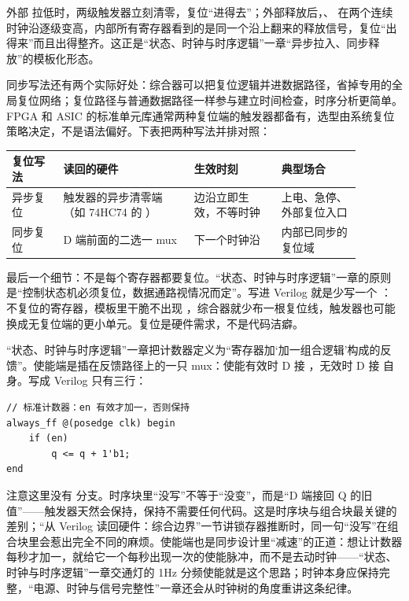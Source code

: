 外部  拉低时，两级触发器立刻清零，复位“进得去”；外部释放后，、 在两个连续时钟沿逐级变高，内部所有寄存器看到的是同一个沿上翻来的释放信号，复位“出得来”而且出得整齐。这正是“状态、时钟与时序逻辑”一章“异步拉入、同步释放”的模板化形态。

同步写法还有两个实际好处：综合器可以把复位逻辑并进数据路径，省掉专用的全局复位网络；复位路径与普通数据路径一样参与建立时间检查，时序分析更简单。FPGA 和 ASIC 的标准单元库通常两种复位端的触发器都备有，选型由系统复位策略决定，不是语法偏好。下表把两种写法并排对照：

\begin{longtable}{L{0.13\linewidth}L{0.33\linewidth}L{0.22\linewidth}L{0.20\linewidth}}
\toprule
复位写法 & 读回的硬件 & 生效时刻 & 典型场合 \\
\midrule
异步复位 & 触发器的异步清零端（如 74HC74 的 ） &  边沿立即生效，不等时钟 & 上电、急停、外部复位入口 \\\tablerowrule
同步复位 & D 端前面的二选一 mux & 下一个时钟沿 & 内部已同步的复位域 \\
\bottomrule
\end{longtable}

最后一个细节：不是每个寄存器都要复位。“状态、时钟与时序逻辑”一章的原则是“控制状态机必须复位，数据通路视情况而定”。写进 Verilog 就是少写一个 ：不复位的寄存器，模板里干脆不出现 ，综合器就少布一根复位线，触发器也可能换成无复位端的更小单元。复位是硬件需求，不是代码洁癖。


“状态、时钟与时序逻辑”一章把计数器定义为“寄存器加‘加一组合逻辑’构成的反馈”。使能端是插在反馈路径上的一只 mux：使能有效时 D 接 ，无效时 D 接  自身。写成 Verilog 只有三行：

\begin{lstlisting}
// 标准计数器：en 有效才加一，否则保持
always_ff @(posedge clk) begin
    if (en)
        q <= q + 1'b1;
end
\end{lstlisting}

注意这里没有  分支。时序块里“没写”不等于“没变”，而是“D 端接回 Q 的旧值”——触发器天然会保持，保持不需要任何代码。这是时序块与组合块最关键的差别；“从 Verilog 读回硬件：综合边界”一节讲锁存器推断时，同一句“没写”在组合块里会惹出完全不同的麻烦。使能端也是同步设计里“减速”的正道：想让计数器每秒才加一，就给它一个每秒出现一次的使能脉冲，而不是去动时钟——“状态、时钟与时序逻辑”一章交通灯的 1Hz 分频使能就是这个思路；时钟本身应保持完整，“电源、时钟与信号完整性”一章还会从时钟树的角度重讲这条纪律。

